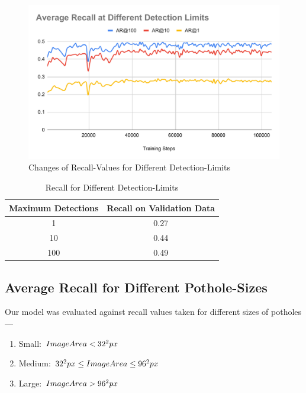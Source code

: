             \begin{figure}
                \centering
                \includegraphics[width=\textwidth]{images/Average Recall at Different Detection Limits.pdf}
                \caption{Changes of Recall-Values for Different Detection-Limits}
                \label{fig:recall_limits}
            \end{figure}
            
            \begin{table}
                \centering
                \begin{tabular}{|c||c|} \hline 
                     Maximum Detections  &  Recall on Validation Data \\\hline\hline
                     1  &  0.27 \\\hline
                     10  &  0.44 \\\hline
                     100  &  0.49 \\\hline
                \end{tabular}
                \caption{Recall for Different Detection-Limits}
                \label{tab:recall_limits}
            \end{table}
            
        \clearpage
        \subsection{Average Recall for Different Pothole-Sizes}
            Our model was evaluated against recall values taken for different sizes of potholes---
            \begin{enumerate}
                \item {Small: $Image\-Area < 32^2 px$}
                \item {Medium: $32^2 px \leq Image\-Area \leq 96^2 px$}
                \item {Large: $Image\-Area > 96^2 px$}
            \end{enumerate}
            
